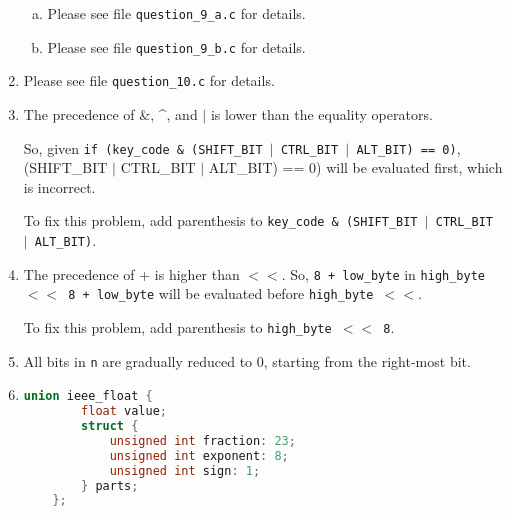 \documentclass[12pt]{article}
\begin{document}
\begin{enumerate}[1.]
    \begin{enumerate}[a)]
        \item

        Please see file \texttt{question\_9\_a.c} for details.

        \item

        Please see file \texttt{question\_9\_b.c} for details.
    \end{enumerate}

    \item

    Please see file \texttt{question\_10.c} for details.

    \item

    The precedence of \&, \^{}, and $\vert$ is lower than the equality operators.

    \bigskip

    So, given \texttt{if (key\_code \& (SHIFT\_BIT $\vert$ CTRL\_BIT $\vert$ ALT\_BIT) == 0)},
    (SHIFT\_BIT $\vert$ CTRL\_BIT $\vert$ ALT\_BIT) == 0) will be evaluated first, which is incorrect.

    \bigskip

    To fix this problem, add parenthesis to \texttt{key\_code \& (SHIFT\_BIT $\vert$ CTRL\_BIT $\vert$ ALT\_BIT)}.

    \item

    The precedence of + is higher than $<<$. So, \texttt{8 + low\_byte} in
    \texttt{high\_byte $<<$ 8 + low\_byte} will be evaluated before \texttt{high\_byte $<<$}.

    \bigskip

    To fix this problem, add parenthesis to \texttt{high\_byte $<<$ 8}.

    \item

    All bits in \texttt{n} are gradually reduced to 0, starting from the right-most bit.

    \item

\begin{lstlisting}[language=c]
    union ieee_float {
        float value;
        struct {
            unsigned int fraction: 23;
            unsigned int exponent: 8;
            unsigned int sign: 1;
        } parts;
    };
\end{lstlisting}

    \bigskip


\end{enumerate}
\end{document}
